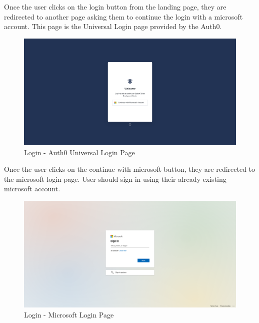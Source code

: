\begin{justify}
    \vspace{0.25cm}
    \newendline Once the user clicks on the login button from the landing page, they are redirected to another page asking them to continue the login with a microsoft account. This page is the Universal Login page provided by the Auth0.

    \begin{figure}[H]
        \centerline{\includegraphics[width=150mm,scale=1]{figures/implementation_and_testing/implementation/frontend/pages/Login - Continue with Microsoft.png}}
        \caption{Login - Auth0 Universal Login Page}
    \end{figure}


    \vspace{0.25cm}
    \newendline Once the user clicks on the continue with microsoft button, they are redirected to the microsoft login page. User should sign in using their already existing microsoft account.

    \begin{figure}[H]
        \centerline{\includegraphics[width=150mm,scale=1]{figures/implementation_and_testing/implementation/frontend/pages/Login - Sign in MS .png}}
        \caption{Login - Microsoft Login Page}
    \end{figure}



\end{justify}
